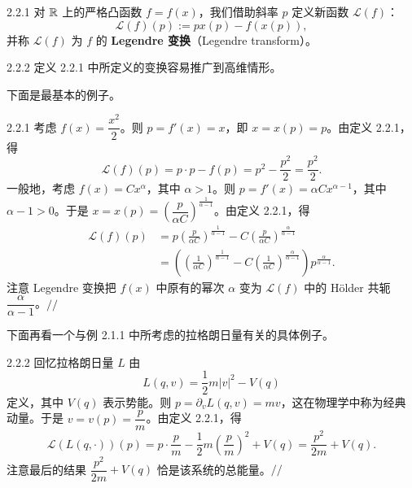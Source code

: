 \begin{wdefn}{2.2.1}
对 $\mathbb{R}$ 上的严格凸函数 $f=f(x)$，我们借助斜率 $p$ 定义新函数 $\mathcal{L}(f)$：
\[
  \mathcal{L}(f)(p):=px(p)-f(x(p)),
\]
并称 $\mathcal{L}(f)$ 为 $f$ 的 \textbf{Legendre 变换}（Legendre transform）。
\end{wdefn}

\begin{wrem}{2.2.2}
定义 2.2.1 中所定义的变换容易推广到高维情形。
\end{wrem}

下面是最基本的例子。

\begin{wexam}{2.2.1}
考虑 $f(x)=\dfrac{x^2}{2}$。则 $p=f'(x)=x$，即 $x=x(p)=p$。由定义 2.2.1，得
\[
  \mathcal{L}(f)(p)=p\cdot p-f(p)=p^2-\frac{p^2}{2}=\frac{p^2}{2}.
\]
一般地，考虑 $f(x)=Cx^\alpha$，其中 $\alpha>1$。则 $p=f'(x)=\alpha Cx^{\alpha-1}$，其中 $\alpha-1>0$。于是 $x=x(p)=\left(\dfrac{p}{\alpha C}\right)^{\frac{1}{\alpha-1}}$。由定义 2.2.1，得
\begin{align*}
  \mathcal{L}(f)(p)
  &=p\left(\frac{p}{\alpha C}\right)^{\frac{1}{\alpha-1}}
    -C\left(\frac{p}{\alpha C}\right)^{\frac{\alpha}{\alpha-1}}\\
  &=\left(\left(\frac{1}{\alpha C}\right)^{\frac{1}{\alpha-1}}
    -C\left(\frac{1}{\alpha C}\right)^{\frac{\alpha}{\alpha-1}}\right)
    p^{\frac{\alpha}{\alpha-1}}.
\end{align*}
注意 Legendre 变换把 $f(x)$ 中原有的幂次 $\alpha$ 变为 $\mathcal{L}(f)$ 中的 Hölder 共轭 $\dfrac{\alpha}{\alpha-1}$。\hfill$//$
\end{wexam}

下面再看一个与例 2.1.1 中所考虑的拉格朗日量有关的具体例子。

\begin{wexam}{2.2.2}
回忆拉格朗日量 $L$ 由
\[
  L(q,v)=\frac12m|v|^2-V(q)
\]
定义，其中 $V(q)$ 表示势能。则 $p=\partial_vL(q,v)=mv$，这在物理学中称为经典动量。于是 $v=v(p)=\dfrac{p}{m}$。由定义 2.2.1，得
\[
  \mathcal{L}(L(q,\cdot))(p)=p\cdot\frac{p}{m}
  -\frac12m\left(\frac{p}{m}\right)^2+V(q)
  =\frac{p^2}{2m}+V(q).
\]
注意最后的结果 $\dfrac{p^2}{2m}+V(q)$ 恰是该系统的总能量。\hfill$//$
\end{wexam}

